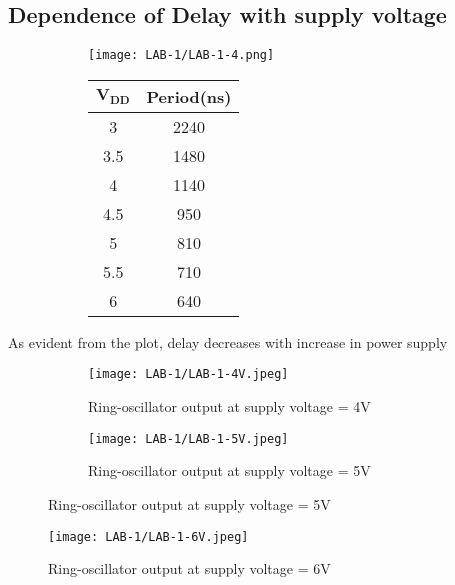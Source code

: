 \documentclass[12pt]{article}
\begin{document}


\subsection{Dependence of Delay with supply voltage}
\vspace{4mm}
  \begin{figure}[H]
    \begin{subfigure}{0.7\linewidth}
      \centering
      \texttt{[image: LAB-1/LAB-1-4.png]}
    \end{subfigure} 
    \begin{subfigure}{0.2\linewidth}
      \centering
      \begin{tabular}{|c|c|}
       \hline
       \bfseries $\mathbf{V_{DD}}$	& \bfseries	Period(ns)	\\
       \hline
            3 &	2240\\
            3.5 &	1480\\
            4 &	1140\\
            4.5 &	950\\
            5 &	810\\
            5.5 &	710\\
            6 &	640\\

        \hline
      \end{tabular}
    \end{subfigure}
   \end{figure}
   As evident from the plot, delay decreases with increase in power supply
   \begin{figure}[H]
     \begin{subfigure}{0.4\linewidth}
       \centering
       \texttt{[image: LAB-1/LAB-1-4V.jpeg]}
       \caption{Ring-oscillator output at supply voltage = 4V }
     \end{subfigure}
     \begin{subfigure}{0.4\linewidth}
       \centering
       \texttt{[image: LAB-1/LAB-1-5V.jpeg]}
       \caption{Ring-oscillator output at supply voltage = 5V}
     \end{subfigure}
   \end{figure}
   \begin{figure}[H]
       \centering
       \texttt{[image: LAB-1/LAB-1-6V.jpeg]}
       \caption{Ring-oscillator output at supply voltage = 6V}
   \end{figure}
   
\end{document}
